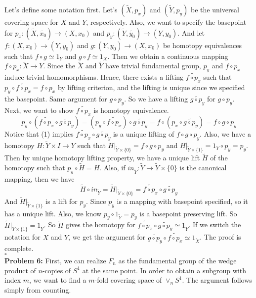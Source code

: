 \documentclass[12pt]{amsart}
\begin{document}
Let's define some notation first. Let's $(\tilde{X},p_x)$ and $(\tilde{Y},p_y)$ be the universal covering space for $X$ and $Y$, respectively. Also, we want to specify the basepoint for $p_x:(\tilde{X},\tilde{x_0})\to (X,x_0)$ and $p_y:(\tilde{Y},\tilde{y_0})\to (Y,y_0) $. And let $f:(X,x_0)\to (Y,y_0)$ and $g:(Y,y_0)\to (X,x_0)$ be homotopy equivalences such that $f\circ g\simeq 1_Y$ and $g\circ f\simeq 1_X$. Then we obtain a continuous mapping $f\circ p_x:\tilde{X}\to Y$. Since the $\tilde{X}$ and $\tilde{Y}$ have trivial fundamental group, $p_y$ and $f\circ p_x$ induce trivial homomorphisms. Hence, there exists a lifting $\widetilde{f\circ p_x}$ such that $p_y\circ \widetilde{f\circ p_x}=f\circ p_x$ by lifting criterion, and the lifting is unique since we specified the basepoint. Same argument for $g\circ p_y$. So we have a lifting $\widetilde{g\circ p_y}$ for $g\circ p_y$. \\
Next, we want to show $\widetilde{f\circ p_x}$ is homotopy equivalence. 
\[p_y\circ (\widetilde{f\circ p_x}\circ \widetilde{g\circ p_y})=(p_y\circ \widetilde{f\circ p_x})\circ \widetilde{g\circ p_y}=f\circ (p_x\circ \widetilde{g\circ p_y})=f\circ g\circ p_y\tag{1}\]
Notice that (1) implies $\widetilde{f\circ p_x}\circ \widetilde{g\circ p_y}$ is a unique lifting of $f\circ g\circ p_y$. Also, we have a homotopy $H:\tilde{Y}\times I\to Y$ such that $H|_{\tilde{Y}\times \{0\}}=f\circ g\circ p_y$ and $H|_{\tilde{Y}\times \{1\}}=1_Y\circ p_y=p_y$. Then by unique homotopy lifting property, we have a unique lift $\tilde{H}$ of the homotopy such that $p_y\circ \tilde{H}=H$. Also, if $in_{\tilde{Y}}:\tilde{Y}\to \tilde{Y}\times \{0\}$ is the canonical mapping, then we have \[\tilde{H}\circ in_{\tilde{Y}}=\tilde{H}|_{\tilde{Y}\times \{0\}}=\widetilde{f\circ p_x}\circ \widetilde{g\circ p_y}\]
And $\tilde{H}|_{\tilde{Y}\times \{1\}}$ is a lift for $p_y$. Since $p_y$ is a mapping with basepoint specified, so it has a unique lift. Also, we know $p_y\circ 1_{\tilde{Y}}=p_y$ is a basepoint preserving lift. So $\tilde{H}|_{\tilde{Y}\times \{1\}}=1_{\tilde{Y}}$. So $\tilde{H}$ gives the homotopy for $\widetilde{f\circ p_x}\circ \widetilde{g\circ p_y}\simeq 1_{\tilde{Y}}$. If we switch the notation for $X$ and $Y$, we get the argument for $\widetilde{g\circ p_y}\circ \widetilde{f\circ p_x}\simeq 1_{\tilde{X}}$. The proof is complete. 
\\\phantom{qed}\hfill$\square$\\
\textbf{Problem 6:} First, we can realize $F_n$ as the fundamental group of the wedge product of $n$-copies of $S^1$ at the same point. In order to obtain a subgroup with index $m$, we want to find a $m$-fold covering space of $\vee_n S^1$. The argument follows simply from counting.\\
\end{document}
